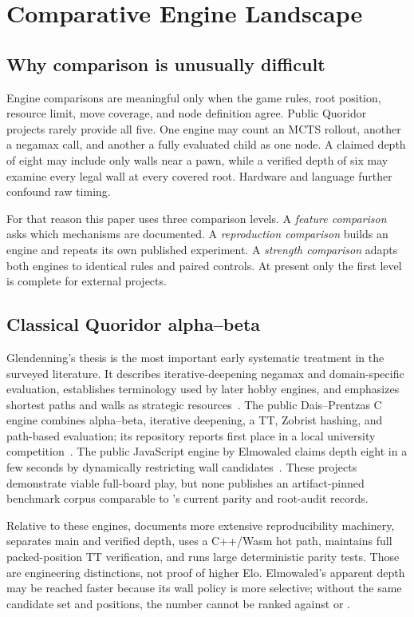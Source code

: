 \section{Comparative Engine Landscape}
\subsection{Why comparison is unusually difficult}
Engine comparisons are meaningful only when the game rules, root position, resource limit, move coverage, and node definition agree. Public Quoridor projects rarely provide all five. One engine may count an MCTS rollout, another a negamax call, and another a fully evaluated child as one node. A claimed depth of eight may include only walls near a pawn, while a verified depth of six may examine every legal wall at every covered root. Hardware and language further confound raw timing.

For that reason this paper uses three comparison levels. A \emph{feature comparison} asks which mechanisms are documented. A \emph{reproduction comparison} builds an engine and repeats its own published experiment. A \emph{strength comparison} adapts both engines to identical rules and paired controls. At present only the first level is complete for external projects.

\subsection{Classical Quoridor alpha--beta}
Glendenning's thesis is the most important early systematic treatment in the surveyed literature. It describes iterative-deepening negamax and domain-specific evaluation, establishes terminology used by later hobby engines, and emphasizes shortest paths and walls as strategic resources~\cite{glendenning2005}. The public Dais--Prentzas C engine combines alpha--beta, iterative deepening, a TT, Zobrist hashing, and path-based evaluation; its repository reports first place in a local university competition~\cite{dais2023}. The public JavaScript engine by Elmowaled claims depth eight in a few seconds by dynamically restricting wall candidates~\cite{elmowaled2025}. These projects demonstrate viable full-board play, but none publishes an artifact-pinned benchmark corpus comparable to \walwuk's current parity and root-audit records.

Relative to these engines, \walwuk{} documents more extensive reproducibility machinery, separates main and verified depth, uses a C++/Wasm hot path, maintains full packed-position TT verification, and runs large deterministic parity tests. Those are engineering distinctions, not proof of higher Elo. Elmowaled's apparent depth may be reached faster because its wall policy is more selective; without the same candidate set and positions, the number cannot be ranked against \mainDepth{} or \verifiedDepth.

